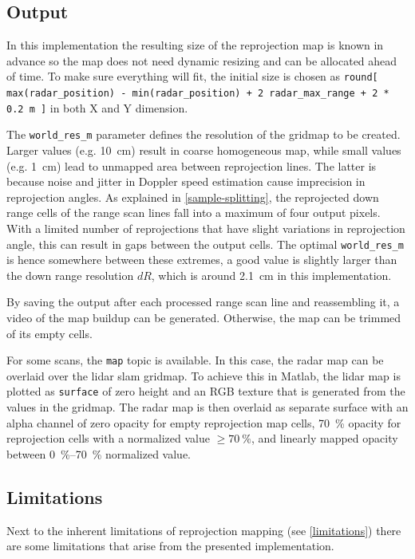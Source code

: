 \subsection{Output}\label{output}
In this implementation the resulting size of the reprojection map is known in advance so the map does not need dynamic resizing and can be allocated ahead of time. To make sure everything will fit, the initial size is chosen as \texttt{round[ max(radar\_position) - min(radar\_position) + 2~radar\_max\_range + 2 * 0.2 m ]} in both X and Y dimension.

The \texttt{world\_res\_m} parameter defines the resolution of the gridmap to be created. Larger values (e.g. \SI{10}{cm}) result in coarse homogeneous map, while small values (e.g. \SI{1}{cm}) lead to unmapped area between reprojection lines. The latter is because noise and jitter in Doppler speed estimation cause imprecision in reprojection angles. As explained in \cref{sample-splitting}, the reprojected down range cells of the range scan lines fall into a maximum of four output pixels. With a limited number of reprojections that have slight variations in reprojection angle, this can result in gaps between the output cells. The optimal \texttt{world\_res\_m} is hence somewhere between these extremes, a good value is slightly larger than the down range resolution $dR$, which is around \SI{2.1}{cm} in this implementation.

By saving the output after each processed range scan line and reassembling it, a video of the map buildup can be generated. Otherwise, the map can be trimmed of its empty cells.

For some scans, the \texttt{map} topic is available. In this case, the radar map can be overlaid over the lidar slam gridmap. To achieve this in Matlab, the lidar map is plotted as \texttt{surface} of zero height and an RGB texture that is generated from the values in the gridmap. The radar map is then overlaid as separate surface with an alpha channel of zero opacity for empty reprojection map cells, \SI{70}{\%} opacity for reprojection cells with a normalized value $\ge \SI{70}{\%}$, and linearly mapped opacity between \SIrange{0}{70}{\%} normalized value.

\subsection{Limitations}\label{limitations-1}

Next to the inherent limitations of reprojection mapping (see \cref{limitations}) there are some limitations that arise from the presented implementation.

